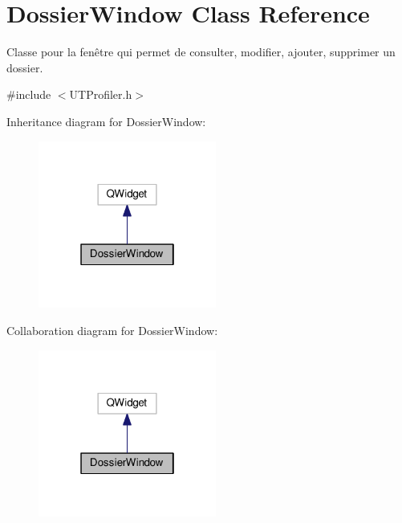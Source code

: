 \hypertarget{class_dossier_window}{\section{Dossier\-Window Class Reference}
\label{class_dossier_window}
}


Classe pour la fenêtre qui permet de consulter, modifier, ajouter, supprimer un dossier.  




{\ttfamily \#include $<$U\-T\-Profiler.\-h$>$}



Inheritance diagram for Dossier\-Window\-:
\nopagebreak
\begin{figure}[H]
\begin{center}
\leavevmode
\includegraphics[width=166pt]{class_dossier_window__inherit__graph}
\end{center}
\end{figure}


Collaboration diagram for Dossier\-Window\-:
\nopagebreak
\begin{figure}[H]
\begin{center}
\leavevmode
\includegraphics[width=166pt]{class_dossier_window__coll__graph}
\end{center}
\end{figure}
